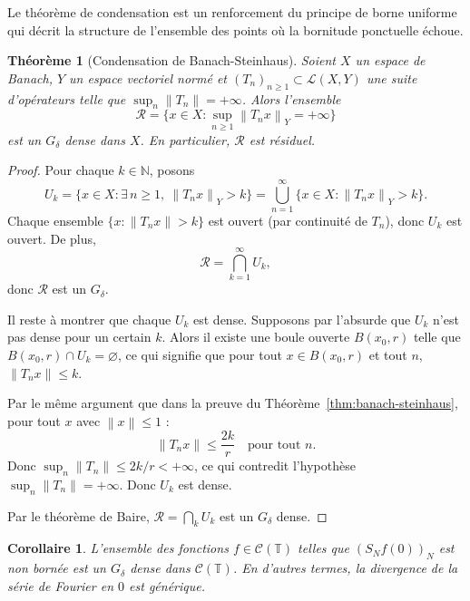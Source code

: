 \documentclass[a4paper,12pt]{book}
\newcommand{\N}{\mathbb{N}}
\newcommand{\norm}[1]{\left\| #1 \right\|}
\theoremstyle{definition}
\theoremstyle{plain}
\newtheorem{theoreme}[definition]{Théorème}
\newtheorem{corollaire}[definition]{Corollaire}
\theoremstyle{remark}
\begin{document}

Le théorème de condensation est un renforcement du principe de borne uniforme
qui décrit la structure de l'ensemble des points où la bornitude ponctuelle échoue.

\begin{theoreme}[Condensation de Banach-Steinhaus]
\label{thm:condensation}
Soient $X$ un espace de Banach, $Y$ un espace vectoriel normé et
$(T_n)_{n \geq 1} \subset \mathcal{L}(X,Y)$ une suite d'opérateurs
telle que $\sup_n \norm{T_n} = +\infty$. Alors l'ensemble
\[
  \mathcal{R} = \bigl\{ x \in X : \sup_{n \geq 1} \norm{T_n x}_Y = +\infty \bigr\}
\]
est un $G_\delta$ dense dans $X$. En particulier,
$\mathcal{R}$ est résiduel.
\end{theoreme}

\begin{proof}
Pour chaque $k \in \N$, posons
\[
  U_k = \bigl\{ x \in X : \exists\, n \geq 1,\ \norm{T_n x}_Y > k \bigr\}
  = \bigcup_{n=1}^{\infty} \bigl\{ x \in X : \norm{T_n x}_Y > k \bigr\}.
\]
Chaque ensemble $\{x : \norm{T_n x} > k\}$ est ouvert (par continuité de $T_n$),
donc $U_k$ est ouvert. De plus,
\[
  \mathcal{R} = \bigcap_{k=1}^{\infty} U_k,
\]
donc $\mathcal{R}$ est un $G_\delta$.

Il reste à montrer que chaque $U_k$ est dense. Supposons par l'absurde que
$U_k$ n'est pas dense pour un certain $k$. Alors il existe une boule ouverte
$B(x_0, r)$ telle que $B(x_0, r) \cap U_k = \varnothing$, ce qui signifie
que pour tout $x \in B(x_0, r)$ et tout $n$, $\norm{T_n x} \leq k$.

Par le même argument que dans la preuve du Théorème~\ref{thm:banach-steinhaus},
pour tout $x$ avec $\norm{x} \leq 1$ :
\[
  \norm{T_n x} \leq \frac{2k}{r} \quad \text{pour tout } n.
\]
Donc $\sup_n \norm{T_n} \leq 2k/r < +\infty$, ce qui contredit l'hypothèse
$\sup_n \norm{T_n} = +\infty$. Donc $U_k$ est dense.

Par le théorème de Baire, $\mathcal{R} = \bigcap_{k} U_k$ est un $G_\delta$ dense.
\end{proof}

\begin{corollaire}
\label{cor:condensation-fourier}
L'ensemble des fonctions $f \in \mathcal{C}(\mathbb{T})$ telles que
$(S_N f(0))_N$ est non bornée est un $G_\delta$ dense dans $\mathcal{C}(\mathbb{T})$.
En d'autres termes, la divergence de la série de Fourier en $0$ est
\emph{générique}.
\end{corollaire}
\end{document}
